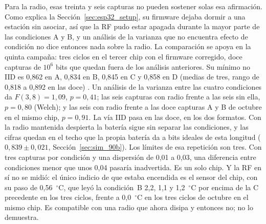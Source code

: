 Para la radio, esas treinta y seis capturas no pueden sostener solas esa
afirmación. Como explica la Sección~\ref{sec:esp32_setup}, su firmware
dejaba dormir a una estación sin asociar, así que la RF pudo estar
apagada durante la mayor parte de las condiciones A y B, y un análisis
de la varianza que no encuentra efecto de condición no dice entonces
nada sobre la radio. La comparación se apoya en la quinta campaña: tres
ciclos en el tercer chip con el firmware corregido, doce capturas de
$10^6$ bits que quedan fuera de los análisis anteriores. Su mínimo no
IID es 0,862 en A, 0,834 en B, 0,845 en C y 0,858 en D (medias de tres,
rango de 0,818 a 0,892 en las doce) \meas{}. Un análisis de la varianza
entre las cuatro condiciones da $F(3, 8) = 1{,}09$, $p = 0{,}41$; las
seis capturas con radio frente a las seis sin ella, $p = 0{,}80$
(Welch); y las seis con radio frente a las doce capturas A y B de
octubre en el mismo chip, $p = 0{,}91$. La vía IID pasa en las doce, en
los dos formatos. Con la radio mantenida despierta la batería sigue sin
separar las condiciones, y las cifras quedan en el techo que la propia
batería da a bits ideales de esta longitud ($0{,}839 \pm 0{,}021$,
Sección~\ref{sec:sim_90b}). Los límites de esa repetición son tres. Con
tres capturas por condición y una dispersión de 0,01 a 0,03, una
diferencia entre condiciones menor que unos 0,04 pasaría inadvertida. Es
un solo chip. Y la RF en sí no se midió: el único indicio de que estaba
encendida es el sensor del chip, con su paso de 0,56~$^\circ$C, que leyó
la condición~B 2,2, 1,1 y 1,2~$^\circ$C por encima de la C precedente en
los tres ciclos, frente a 0,0~$^\circ$C en los tres ciclos de octubre en
el mismo chip. Es compatible con una radio que ahora disipa y entonces
no; no lo demuestra.

